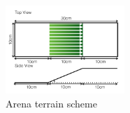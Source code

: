 \begin{figure}[h]
    	\includegraphics[width=0.4\textwidth]{img/model_components_cartoons_011}
      \caption{Arena terrain scheme}
\end{figure}





